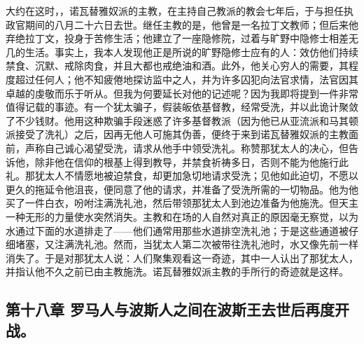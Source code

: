 大约在这时，，诺瓦替雅奴派的主教，在主持自己教派的教会七年后，于与担任执政官期间的八月二十六日去世。继任主教的是，他曾是一名拉丁文教师；但后来他弃绝拉丁文，投身于苦修生活；他建立了一座隐修院，过着与旷野中隐修士相差无几的生活。事实上，我本人发现他正是所说的旷野隐修士应有的人：效仿他们持续禁食、沉默、戒除肉食，并且大都也戒绝油和酒。此外，他关心穷人的需要，其程度超过任何人；他不知疲倦地探访监中之人，并为许多囚犯向法官求情，法官因其卓越的虔敬而乐于听从。但我为何要延长对他的记述呢？因为我即将提到一件非常值得记载的事迹。有一个犹太骗子，假装皈依基督教，经常受洗，并以此诡计聚敛了不少钱财。他用这种欺骗手段迷惑了许多基督教派（因为他已从亚流派和马其顿派接受了洗礼）之后，因再无他人可施其伪善，便终于来到诺瓦替雅奴派的主教面前，声称自己诚心渴望受洗，请求从他手中领受洗礼。称赞那犹太人的决心，但告诉他，除非他在信仰的根基上得到教导，并禁食祈祷多日，否则不能为他施行此礼。那犹太人不情愿地被迫禁食，却更加急切地请求受洗；见他如此迫切，不愿以更久的拖延令他沮丧，便同意了他的请求，并准备了受洗所需的一切物品。他为他买了一件白衣，吩咐注满洗礼池，然后带领那犹太人到池边准备为他施洗。但天主一种无形的力量使水突然消失。主教和在场的人自然对真正的原因毫无察觉，以为水通过下面的水道排走了——他们通常用那些水道排空洗礼池；于是这些通道被仔细堵塞，又注满洗礼池。然而，当犹太人第二次被带往洗礼池时，水又像先前一样消失了。于是对那犹太人说：人们聚集观看这一奇迹，其中一人认出了那犹太人，并指认他不久之前已由主教施洗。诺瓦替雅奴派主教的手所行的奇迹就是这样。\par


\subsection{第十八章 罗马人与波斯人之间在波斯王去世后再度开战。}

